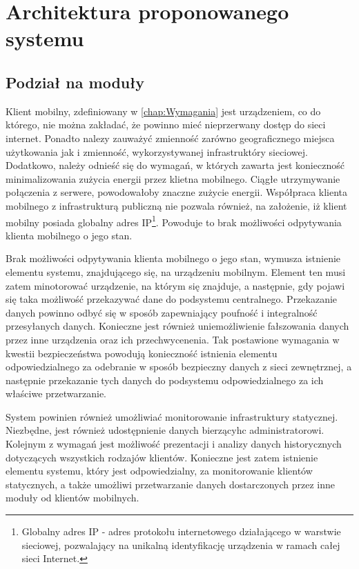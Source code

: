 \chapter{Architektura proponowanego systemu}
\label{chap:ArchCal}

\section[Podział na moduły][Podział na moduły]{Podział na moduły}

Klient mobilny, zdefiniowany w \ref{chap:Wymagania} jest urządzeniem,
co do którego, nie można zakładać, że powinno mieć nieprzerwany dostęp
do sieci internet. Ponadto nalezy zauważyć zmienność zarówno
geograficznego miejsca użytkowania jak i zmienność, wykorzystywanej
infrastruktóry sieciowej. Dodatkowo, należy odnieść się do wymagań, w
których zawarta jest konieczność minimalizowania zużycia energii przez
klietna mobilnego. Ciągłe utrzymywanie połączenia z serwere,
powodowałoby znaczne zużycie energii. Współpraca klienta mobilnego z
infrastrukturą publiczną nie pozwala również, na założenie, iż klient
mobilny posiada globalny adres IP\footnote{Globalny adres IP - adres
  protokołu internetowego działającego w warstwie sieciowej,
  pozwalający na unikalną identyfikację urządzenia w ramach całej
  sieci Internet.}. Powoduje to brak możliwości odpytywania klienta
mobilnego o jego stan.

Brak możliwości odpytywania klienta mobilnego o jego stan, wymusza
istnienie elementu systemu, znajdującego się, na urządzeniu
mobilnym. Element ten musi zatem minotorować urządzenie, na którym się
znajduje, a następnie, gdy pojawi się taka możliwość przekazywać dane
do podsystemu centralnego. Przekazanie danych powinno odbyć się w
sposób zapewniający poufność i integralność przesyłanych
danych. Konieczne jest również uniemożliwienie fałszowania danych
przez inne urządzenia oraz ich przechwycenenia. Tak postawione
wymagania w kwestii bezpieczeństwa powodują konieczność istnienia
elementu odpowiedzialnego za odebranie w sposób bezpieczny danych z
sieci zewnętrznej, a następnie przekazanie tych danych do podsystemu
odpowiedzialnego za ich właściwe przetwarzanie.

System powinien również umożliwiać monitorowanie infrastruktury
statycznej. Niezbędne, jest również udostępnienie danych bierzącyhc
administratorowi. Kolejnym z wymagań jest możliwość prezentacji i
analizy danych historycznych dotyczących wszystkich rodzajów
klientów. Konieczne jest zatem istnienie elementu systemu, który jest
odpowiedzialny, za monitorowanie klientów statycznych, a także
umożliwi przetwarzanie danych dostarczonych przez inne moduły od
klientów mobilnych. 

